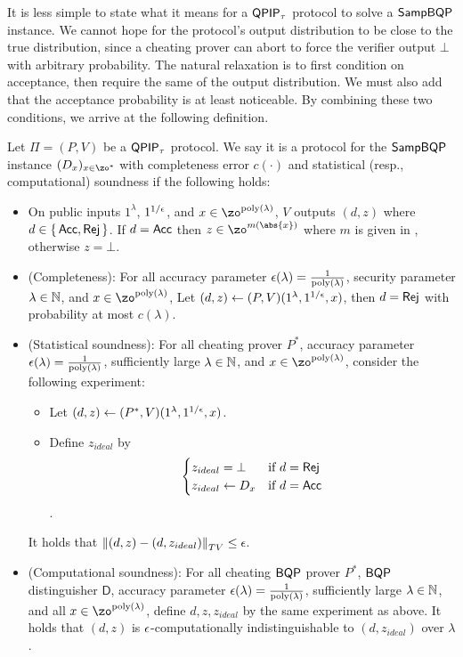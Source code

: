 It is less simple to state what it means for a $\operatorname{\mathsf{QPIP}}_\tau$ protocol to solve a $\operatorname{\mathsf{SampBQP}}$ instance.
We cannot hope for the protocol's output distribution to be close to the true distribution,
since a cheating prover can abort to force the verifier output $\bot$ with arbitrary probability.
The natural relaxation is to first condition on acceptance, then require the same of the output distribution.
We must also add that the acceptance probability is at least noticeable.
By combining these two conditions, we arrive at the following definition.

\begin{definition}
    \label{dfn:stats-secure-proto-sampbqp}
    Let $\Pi=(P, V)$ be a $\operatorname{\mathsf{QPIP}}_\tau$ protocol.
    We say it is a protocol for the $\operatorname{\mathsf{SampBQP}}$ instance $(D_x)_{x\in\zo^*}$ with completeness error $c(\cdot)$ and statistical (resp., computational) soundness if the following holds:
    \begin{itemize}
        \item On public inputs $1^\lambda$, $1^{1/\epsilon}$, and $x\in\zo^{\poly(\lambda)}$, $V$ outputs $(d, z)$ where $d\in\set{\mathsf{Acc}, \mathsf{Rej}}$.
            If $d=\mathsf{Acc}$ then $z\in\zo^{m(\abs{x})}$ where $m$ is given in , otherwise $z=\bot$.
        \item (Completeness):
            For all accuracy parameter $\epsilon(\lambda)=\frac{1}{\operatorname*{\operatorname{poly}}(\lambda)}$,
            security parameter $\lambda\in\mathbb{N}$,
            and $x\in\zo^{\poly(\lambda)}$,
            Let $(d, z)\leftarrow(P, V)(1^\lambda, 1^{1/\epsilon}, x)$, then $d=\mathsf{Rej}$ with probability at most $c(\lambda)$.
        \item (Statistical soundness): For all cheating prover $P^*$,
            accuracy parameter $\epsilon(\lambda)=\frac{1}{\operatorname*{\operatorname{poly}}(\lambda)}$,
            sufficiently large $\lambda\in\mathbb{N}$, and $x\in\zo^{\poly(\lambda)}$,
            consider the following experiment:
            \begin{itemize}
                \item Let $(d, z)\leftarrow(P^*, V)(1^\lambda, 1^{1/\epsilon}, x)$.
                \item Define $z_{ideal}$ by
                $$\begin{cases}
                    z_{ideal}=\bot & \text{if } d=\mathsf{Rej}\\
                    z_{ideal}\leftarrow D_x & \text{if } d=\mathsf{Acc}
                \end{cases}$$.
            \end{itemize}
            It holds that $\left\lVert(d,z)-(d,z_{ideal})\right\rVert_{TV}\leq\epsilon$.
		\item (Computational soundness):
        For all cheating $\operatorname{\mathsf{BQP}}$ prover $P^*$, $\operatorname{\mathsf{BQP}}$ distinguisher $\mathsf{D}$, accuracy parameter $\epsilon(\lambda)=\frac{1}{\operatorname*{\operatorname{poly}}(\lambda)}$,
            sufficiently large $\lambda\in\mathbb{N}$, and all $x\in\zo^{\poly(\lambda)}$,
            define $d, z, z_{ideal}$ by the same experiment as above.
            It holds that $(d, z)$ is $\epsilon$-computationally indistinguishable to $(d, z_{ideal})$ over $\lambda$.
    \end{itemize}
\end{definition}

